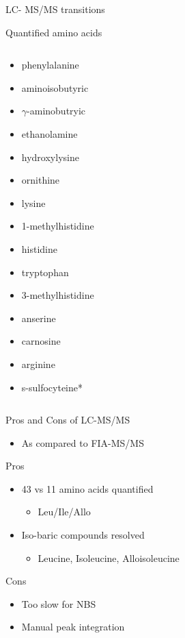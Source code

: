 \documentclass[presentation, smaller]{beamer}
\begin{document}
\begin{frame}[label={sec:orgheadline27}]{LC- MS/MS transitions}
\begin{block}{Quantified amino acids}
\begin{columns}
\begin{column}{0.3\columnwidth}
\begin{itemize}
\item phenylalanine
\item aminoisobutyric
\item \(\gamma\)-aminobutryic
\item ethanolamine
\item hydroxylysine
\item ornithine
\item lysine
\item 1-methylhistidine
\item histidine
\item tryptophan
\item 3-methylhistidine
\item anserine
\item carnosine
\item arginine
\item s-sulfocyteine*
\end{itemize}
\end{column}
\end{columns}
\end{block}
\end{frame}




\begin{frame}[label={sec:orgheadline28}]{Pros and Cons of LC-MS/MS}
\begin{itemize}
\item As compared to FIA-MS/MS
\end{itemize}
\begin{block}{Pros}
\begin{itemize}
\item 43 vs 11 amino acids quantified
\begin{itemize}
\item Leu/Ile/Allo
\end{itemize}
\item Iso-baric compounds resolved
\begin{itemize}
\item Leucine, Isoleucine, Alloisoleucine
\end{itemize}
\end{itemize}
\end{block}
\begin{block}{Cons}
\begin{itemize}
\item Too slow for NBS
\item Manual peak integration
\end{itemize}
\end{block}
\end{frame}
\end{document}
